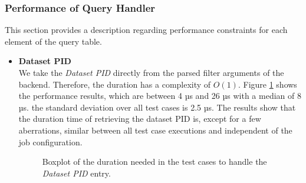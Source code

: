 \documentclass[draft,final]{vutinfth} %
\begin{document}
\subsubsection{Performance of Query Handler}\label{Evaluation:impact_perf_query}
This section provides a description regarding performance constraints for each element of the query table.

\begin{itemize}
	\item \textbf{Dataset PID} \\
	We take the \textit{Dataset PID} directly from the parsed filter arguments of the backend. Therefore, the duration has a complexity of $O(1)$. Figure \ref{fig:evaluation_perf_datapid} shows the performance results, which are between 4 µs and 26 µs with a median of 8 µs. the standard deviation over all test cases is 2.5 µs. The results show that the duration time of retrieving the dataset PID is, except for a few aberrations, similar between all test case executions and independent of the job configuration.
	\begin{figure}[!h]
		\centering
		\caption{Boxplot of the duration needed in the test cases to handle the \textit{Dataset PID} entry. }
		\label{fig:evaluation_perf_datapid}
	\end{figure}


\end{itemize}
\end{document}
